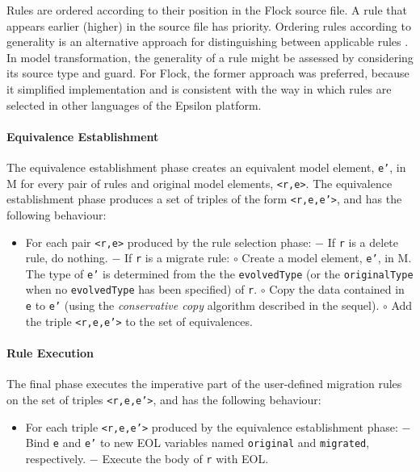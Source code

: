 Rules are ordered according to their position in the Flock source file. A rule that appears earlier (higher) in the source file has priority. Ordering rules according to generality is an alternative approach for distinguishing between applicable rules \cite{wallace05modular}. In model transformation, the generality of a rule might be assessed by considering its source type and guard. For Flock, the former approach was preferred, because it simplified implementation and is consistent with the way in which rules are selected in other languages of the Epsilon platform.

\paragraph{Equivalence Establishment}
The equivalence establishment phase creates an equivalent model element, \texttt{e'}, in M for every pair of rules and original model elements, \texttt{<r,e>}. The equivalence establishment phase produces a set of triples of the form \texttt{<r,e,e'>}, and has the following behaviour:

\begin{itemize}
	\item For each pair \texttt{<r,e>} produced by the rule selection phase:
	\subitem $-$ If \texttt{r} is a delete rule, do nothing.
	\subitem $-$ If \texttt{r} is a migrate rule:
	\subsubitem $\circ$ Create a model element, \texttt{e'}, in M. The type of \texttt{e'} is determined from the the \texttt{evolvedType} (or the \texttt{originalType} when no \texttt{evolvedType} has been specified) of \texttt{r}.
	\subsubitem $\circ$ Copy the data contained in \texttt{e} to \texttt{e'} (using the \emph{conservative copy} algorithm described in the sequel).
	\subsubitem $\circ$ Add the triple \texttt{<r,e,e'>} to the set of equivalences.
\end{itemize}
	
\paragraph{Rule Execution}
The final phase executes the imperative part of the user-defined migration rules on the set of triples \texttt{<r,e,e'>}, and has the following behaviour:

\begin{itemize}
	\item For each triple \texttt{<r,e,e'>} produced by the equivalence establishment phase:
	\subitem $-$ Bind \texttt{e} and \texttt{e'} to new EOL variables named \texttt{or\-ig\-in\-al} and \texttt{mi\-gr\-at\-ed}, respectively.
	\subitem $-$ Execute the body of \texttt{r} with EOL.
\end{itemize}


